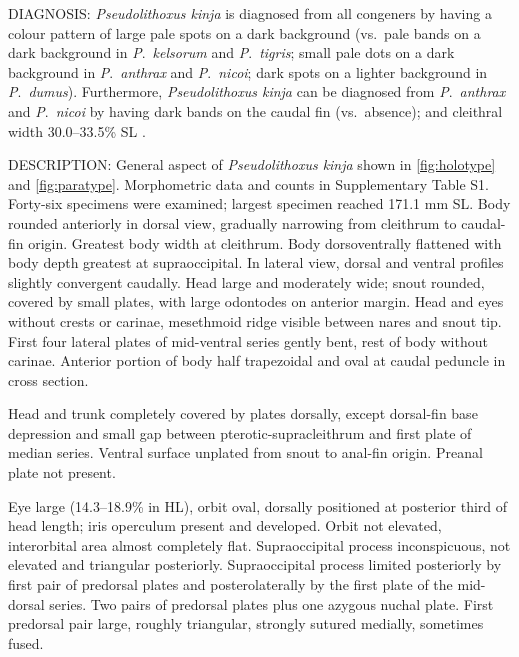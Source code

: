 \documentclass[12pt]{article}
\begin{document}
\noindent DIAGNOSIS: \emph{Pseudolithoxus kinja} is diagnosed from all congeners by having a colour pattern of large pale spots on a dark background (vs.\ pale bands on a dark background in \emph{P}.\ \emph{kelsorum} and \emph{P}.\ \emph{tigris}; small pale dots on a dark background in \emph{P}.\ \emph{anthrax} and \emph{P}.\ \emph{nicoi}; dark spots on a lighter background in \emph{P}.\ \emph{dumus}). %
Furthermore, \emph{Pseudolithoxus kinja} can be diagnosed from \emph{P}.\ \emph{anthrax} and \emph{P}.\ \emph{nicoi} by having dark bands on the caudal fin (vs.\ absence); and cleithral width 30.0--33.5\% SL \citep[vs.\ 27.2--30.5\% in \emph{P}.\ \emph{anthrax} and 27.0--28.6\% in \emph{P}.\ \emph{nicoi}; data from ][]{Armbruster2000}.\\%
\bigskip

\noindent DESCRIPTION: General aspect of \emph{Pseudolithoxus kinja} shown in \autoref{fig:holotype} and \autoref{fig:paratype}. %
Morphometric data and counts in Supplementary Table S1. %
Forty-six specimens were examined; largest specimen reached 171.1 mm SL. %
Body rounded anteriorly in dorsal view, gradually narrowing from cleithrum to caudal-fin origin. %
Greatest body width at cleithrum. %
Body dorsoventrally flattened with body depth greatest at supraoccipital. %
In lateral view, dorsal and ventral profiles slightly convergent caudally. %
Head large and moderately wide; snout rounded, covered by small plates, with large odontodes on anterior margin. %
Head and eyes without crests or carinae, mesethmoid ridge visible between nares and snout tip. %
First four lateral plates of mid-ventral series gently bent, rest of body without carinae. %
Anterior portion of body half trapezoidal and oval at caudal peduncle in cross section.%

Head and trunk completely covered by plates dorsally, except dorsal-fin base depression and small gap between pterotic-supracleithrum and first plate of median series. %
Ventral surface unplated from snout to anal-fin origin. %
Preanal plate not present.%

Eye large (14.3--18.9\% in HL), orbit oval, dorsally positioned at posterior third of head length; iris operculum present and developed. %
Orbit not elevated, interorbital area almost completely flat. %
Supraoccipital process inconspicuous, not elevated and triangular posteriorly. %
Supraoccipital process limited posteriorly by first pair of predorsal plates and posterolaterally by the first plate of the mid-dorsal series. %
Two pairs of predorsal plates plus one azygous nuchal plate. First predorsal pair large, roughly triangular, strongly sutured medially, sometimes fused.%
\end{document}
